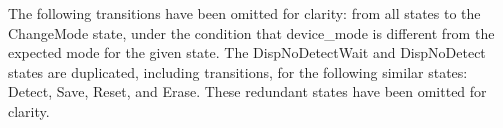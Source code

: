 {\begin{center}
\begin{tikzpicture}[->,>=stealth',
      shorten >=1pt,
      node distance=41mm,
      auto,
      on grid,
      semithick]
  \end{tikzpicture}
\end{center}

The following transitions have been omitted for clarity: from all states
to the ChangeMode state, under the condition that device\_mode is
different from the expected mode for the given state.  The
DispNoDetectWait and DispNoDetect states are duplicated, including
transitions, for the following similar states: Detect, Save, Reset, and
Erase.  These redundant states have been omitted for clarity.

}
